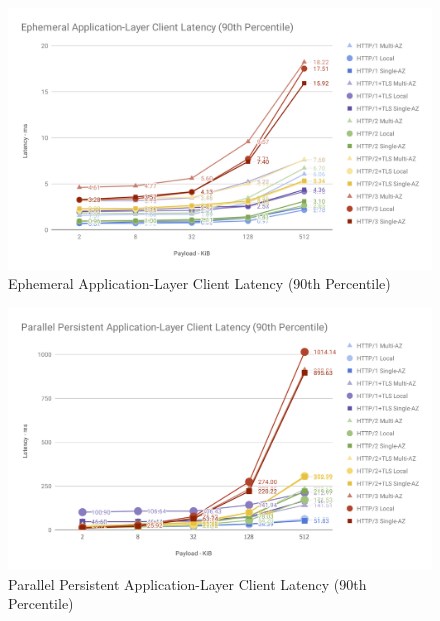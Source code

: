 \begin{figure}[h!]
    \centering
    \includegraphics[width=\linewidth]{figures/charts/Ephemeral Application-Layer Client Latency (90th Percentile).png}
    \caption{Ephemeral Application-Layer Client Latency (90th Percentile)}
    \label{fig:ephemeral_app_latency}
\end{figure}

\begin{figure}[h!]
    \centering
    \includegraphics[width=\linewidth]{figures/charts/Parallel Persistent Application-Layer Client Latency (90th Percentile).png}
    \caption{Parallel Persistent Application-Layer Client Latency (90th Percentile)}
    \label{fig:parallel_app_latency}
\end{figure}

